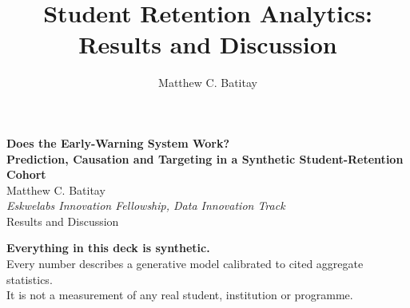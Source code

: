 \documentclass[aspectratio=169,11pt]{beamer}
\title{Student Retention Analytics: Results and Discussion}
\author{Matthew C. Batitay}
\begin{document}
\begin{frame}[plain]
\vspace{0.4cm}
\begin{tcolorbox}[colback=titlebox,colframe=titlebox,arc=4mm,boxrule=0pt,left=10mm,right=10mm,top=7mm,bottom=7mm]
\begin{center}
{\sffamily\bfseries\LARGE Does the Early-Warning System Work?\\[3pt] Prediction, Causation and Targeting in a Synthetic Student-Retention Cohort}\\[12pt]
{\large Matthew C. Batitay}\\[2pt]
{\itshape Eskwelabs Innovation Fellowship, Data Innovation Track}\\[8pt]
{\sffamily\large Results and Discussion}
\end{center}
\end{tcolorbox}
\vfill
\begin{center}
{\sffamily\bfseries\small\textcolor{bad}{Everything in this deck is synthetic.}}\\[2pt]
{\small Every number describes a generative model calibrated to cited aggregate statistics.\\ It is not a measurement of any real student, institution or programme.}
\end{center}
\vspace{0.3cm}
\end{frame}
\end{document}
